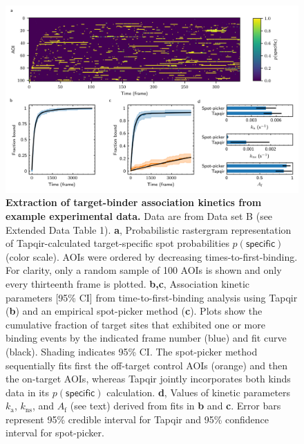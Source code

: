 \begin{figure}[h]
\centering
\includegraphics[width=\textwidth]{figures/figure7.png}
\caption{\textbf{Extraction of target-binder association kinetics from example experimental data.} Data are from Data set B (see Extended Data Table 1).  \textbf{a}, Probabilistic rastergram representation of Tapqir-calculated target-specific spot  probabilities $p(\mathsf{specific})$ (color scale). AOIs were ordered by decreasing times-to-first-binding. For clarity, only a random sample of 100 AOIs is shown and only  every thirteenth frame is plotted. \textbf{b,c}, Association kinetic parameters [95\% CI] from   time-to-first-binding analysis using Tapqir (\textbf{b}) and an empirical spot-picker method \cite{Friedman2013-sf} (\textbf{c}). Plots show the cumulative fraction of target sites that exhibited one or more binding events by the indicated frame number (blue) and fit curve (black). Shading indicates 95\% CI. The spot-picker method sequentially fits first the off-target control AOIs (orange) and then the on-target AOIs, whereas Tapqir jointly incorporates both kinds data in its $p(\mathsf{specific})$ calculation. \textbf{d}, Values of kinetic parameters  $k_\mathrm{a}$, $k_\mathrm{ns}$, and $A_\mathrm{f}$ (see text) derived from fits in \textbf{b} and \textbf{c}. Error bars represent 95\% credible interval for Tapqir and 95\% confidence interval for spot-picker.
}
\label{fig:experimental_data}
\end{figure}
